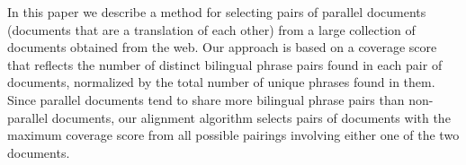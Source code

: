 In this paper we describe a method for selecting pairs of parallel documents (documents that are a translation of each other) from a large collection of documents obtained from the web. Our approach is based on a coverage score that reflects the number of distinct bilingual phrase pairs found in each pair of documents, normalized by the total number of unique phrases found in them. Since parallel documents tend to share more bilingual phrase pairs than non-parallel documents, our alignment algorithm selects pairs of documents with the maximum coverage score from all possible pairings involving either one of the two documents.
